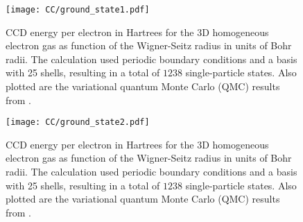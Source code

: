 \documentclass[thesis.tex]{subfiles}
\begin{document}
\begin{figure}[h]
  \centering
  \texttt{[image: CC/ground\_state1.pdf]}
  \caption{CCD energy per electron in Hartrees for the 3D homogeneous electron gas as function of the Wigner-Seitz radius in units of Bohr radii. The calculation used periodic boundary conditions and a basis with 25 shells, resulting in a total of $1238$ single-particle states. Also plotted are the variational quantum Monte Carlo (QMC) results from \cite{LOPEZ2006}.}  
  \label{fig:Ground_State1}
\end{figure}

\begin{figure}[h]
  \centering
  \texttt{[image: CC/ground\_state2.pdf]}
  \caption{CCD energy per electron in Hartrees for the 3D homogeneous electron gas as function of the Wigner-Seitz radius in units of Bohr radii. The calculation used periodic boundary conditions and a basis with 25 shells, resulting in a total of $1238$ single-particle states. Also plotted are the variational quantum Monte Carlo (QMC) results from \cite{LOPEZ2006}.}  
  \label{fig:Ground_States2}
\end{figure}
\end{document}
